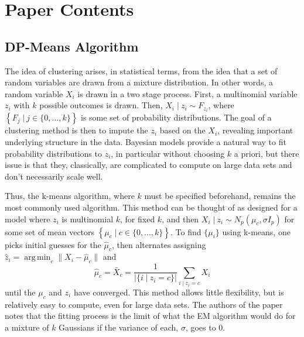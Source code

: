 \documentclass[11pt]{article}
\newcommand{\st}{ \; \big | \:}
\newcommand{\car}[1]{ \left\vert #1 \right\vert}
\theoremstyle{definition}
\DeclareMathOperator*{\argmin}{arg\,min}
\begin{document}
\section{Paper Contents}
\subsection{DP-Means Algorithm}
The idea of clustering arises, in statistical terms, from the idea that a set of random variables are drawn from a mixture distribution. In other words, a random variable $X_i$ is drawn in a two stage process. First, a multinomial variable $z_i$ with $k$ possible outcomes is drawn. Then, $X_i\st z_i\sim F_{z_i}$, where \(\left\{F_j\st j\in\{0,...,k\}\right\}\) is some set of probability distributions. The goal of a clustering method is then to impute the $z_i$ based on the $X_i$, revealing important underlying structure in the data. Bayesian models provide a natural way to fit probability distributions to $z_i$, in particular without choosing $k$ a priori, but there issue is that they, classically, are complicated to compute on large data sets and don't necessarily scale well. \par
Thus, the k-means algorithm, where $k$ must be specified beforehand, remains the most commonly used algorithm. This method can be thought of as designed for a model where $z_i$ is multinomial $k$, for fixed $k$, and then $X_i\st z_i \sim N_p(\mu_c,\sigma I_p)$ for some set of mean vectors \(\left\{\mu_c\st c\in\{0,...,k\}\right\}\). To find $\{\mu_i\}$ using k-means, one picks initial guesses for the $\hat\mu_c$, then alternates assigning \(\hat z_i = \argmin_c \|X_i - \hat\mu_c\|\) and 
\[\hat\mu_c = \bar X_c = \frac{1}{\car{\{i\st z_i=c\}}}\sum_{i\st z_i=c }X_i \] 
until the $\mu_c$ and $z_i$ have converged. This method allows little flexibility, but is relatively easy to compute, even for large data sets. The authors of the paper notes that the fitting process is the limit of what the EM algorithm would do for a mixture of $k$ Gaussians if the variance of each, $\sigma$, goes to 0. \par
\end{document}
